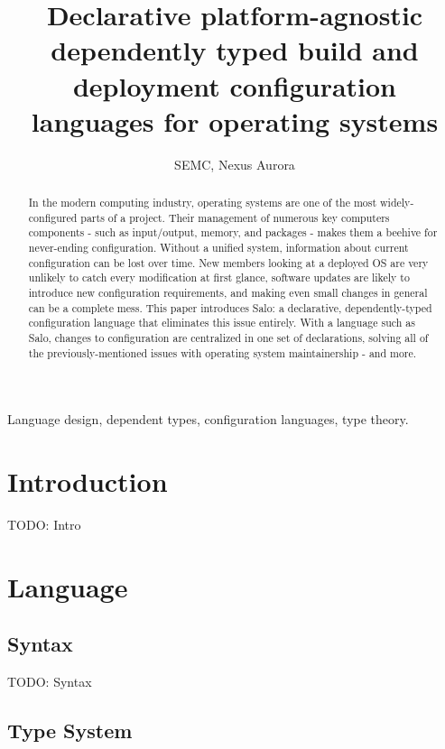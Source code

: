 \documentclass[conference]{IEEEtran}
\begin{document}
\title{\LARGE Declarative platform-agnostic dependently typed build and deployment configuration languages for operating systems}
\author{SEMC, Nexus Aurora}

\maketitle

\begin{abstract}
In the modern computing industry, operating systems are one of the most widely-configured parts of a project. Their management of numerous key computers components - such as  input/output, memory, and packages - makes them a beehive for never-ending configuration. Without a unified system, information about current configuration can be lost over time. New members looking at a deployed OS are very unlikely to catch every modification at first glance, software updates are likely to introduce new configuration requirements, and making even small changes in general can be a complete mess. This paper introduces Salo: a declarative, dependently-typed configuration language that eliminates this issue entirely. With a language such as Salo, changes to configuration are centralized in one set of declarations, solving all of the previously-mentioned issues with operating system maintainership - and more.
\end{abstract}
\IEEEoverridecommandlockouts
\begin{keywords}
Language design, dependent types, configuration languages, type theory.
\end{keywords}

\IEEEpeerreviewmaketitle

\section{Introduction}

TODO: Intro

\section{Language}

\subsection{Syntax}

TODO: Syntax

\subsection{Type System}
\end{document}
